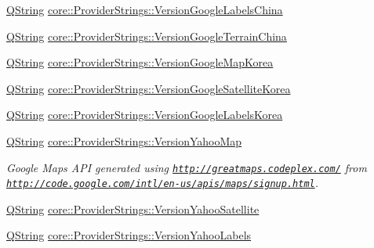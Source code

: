 \begin{DoxyCompactItemize}
\item 
\hyperlink{group___u_a_v_objects_plugin_gab9d252f49c333c94a72f97ce3105a32d}{\-Q\-String} \hyperlink{group___o_p_map_widget_ga702737218086c22a41d6dfaeb6092644}{core\-::\-Provider\-Strings\-::\-Version\-Google\-Labels\-China}
\item 
\hyperlink{group___u_a_v_objects_plugin_gab9d252f49c333c94a72f97ce3105a32d}{\-Q\-String} \hyperlink{group___o_p_map_widget_gad75c975b2a7aeefd01f65c78e701394b}{core\-::\-Provider\-Strings\-::\-Version\-Google\-Terrain\-China}
\item 
\hyperlink{group___u_a_v_objects_plugin_gab9d252f49c333c94a72f97ce3105a32d}{\-Q\-String} \hyperlink{group___o_p_map_widget_ga3487c2fed1d7acaa4c9d34e8b4afd9de}{core\-::\-Provider\-Strings\-::\-Version\-Google\-Map\-Korea}
\item 
\hyperlink{group___u_a_v_objects_plugin_gab9d252f49c333c94a72f97ce3105a32d}{\-Q\-String} \hyperlink{group___o_p_map_widget_ga33344ab29672c4dcedd40642df473969}{core\-::\-Provider\-Strings\-::\-Version\-Google\-Satellite\-Korea}
\item 
\hyperlink{group___u_a_v_objects_plugin_gab9d252f49c333c94a72f97ce3105a32d}{\-Q\-String} \hyperlink{group___o_p_map_widget_ga4f4a5781537c7ee429695a130c8ccbdb}{core\-::\-Provider\-Strings\-::\-Version\-Google\-Labels\-Korea}
\item 
\hyperlink{group___u_a_v_objects_plugin_gab9d252f49c333c94a72f97ce3105a32d}{\-Q\-String} \hyperlink{group___o_p_map_widget_ga3846cf6d2412f72a3c10be8d4066f7fc}{core\-::\-Provider\-Strings\-::\-Version\-Yahoo\-Map}
\begin{DoxyCompactList}\small\item\em \-Google \-Maps \-A\-P\-I generated using \href{http://greatmaps.codeplex.com/}{\tt http\-://greatmaps.\-codeplex.\-com/} from \href{http://code.google.com/intl/en-us/apis/maps/signup.html}{\tt http\-://code.\-google.\-com/intl/en-\/us/apis/maps/signup.\-html}. \end{DoxyCompactList}\item 
\hyperlink{group___u_a_v_objects_plugin_gab9d252f49c333c94a72f97ce3105a32d}{\-Q\-String} \hyperlink{group___o_p_map_widget_ga41e9afc6aa6f634642d2aaa246c1a60e}{core\-::\-Provider\-Strings\-::\-Version\-Yahoo\-Satellite}
\item 
\hyperlink{group___u_a_v_objects_plugin_gab9d252f49c333c94a72f97ce3105a32d}{\-Q\-String} \hyperlink{group___o_p_map_widget_gae16013eddeb9d3b70af56f0e03eeab19}{core\-::\-Provider\-Strings\-::\-Version\-Yahoo\-Labels}
\item 

\end{DoxyCompactItemize}
